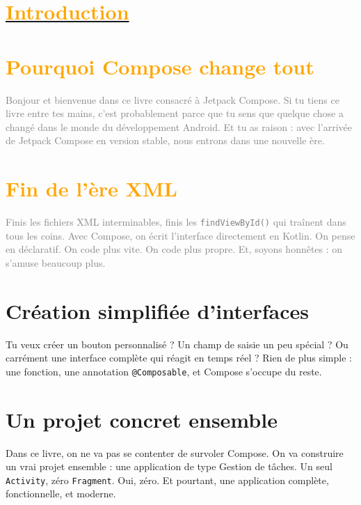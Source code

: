 \section{\hyperref[sec:sommaire]{\textcolor{orange}{Introduction}}}\label{sec:intro}

\noindent
\noindent
\begin{minipage}[t]{0.48\textwidth}
\section*{\footnotesize \textcolor{orange}{Pourquoi Compose change tout}}

{\footnotesize \textcolor{gray}{
Bonjour et bienvenue dans ce livre consacré à Jetpack Compose.  
Si tu tiens ce livre entre tes mains, c’est probablement parce que tu sens que quelque chose a changé dans le monde du développement Android.  
Et tu as raison : avec l’arrivée de Jetpack Compose en version stable, nous entrons dans une nouvelle ère.
}}

 

\vspace{2em} %

\section*{\footnotesize \textcolor{orange}{Fin de l’ère XML}}
{\footnotesize \textcolor{gray}{
Finis les fichiers XML interminables, finis les \texttt{findViewById()} qui traînent dans tous les coins.  
Avec Compose, on écrit l’interface directement en Kotlin.  
On pense en déclaratif.  
On code plus vite.  
On code plus propre.  
Et, soyons honnêtes : on s’amuse beaucoup plus.  
}}
\end{minipage}
\hfill
\begin{minipage}[t]{0.48\textwidth}
\section*{Création simplifiée d’interfaces}

Tu veux créer un bouton personnalisé ?  
Un champ de saisie un peu spécial ?  
Ou carrément une interface complète qui réagit en temps réel ?  
Rien de plus simple : une fonction, une annotation \texttt{@Composable}, et Compose s’occupe du reste.  

\vspace{2em} %

\section*{Un projet concret ensemble}

Dans ce livre, on ne va pas se contenter de survoler Compose.  
On va construire un vrai projet ensemble : une application de type Gestion de tâches.  
Un seul \texttt{Activity}, zéro \texttt{Fragment}. Oui, zéro.  
Et pourtant, une application complète, fonctionnelle, et moderne.  
\end{minipage}
